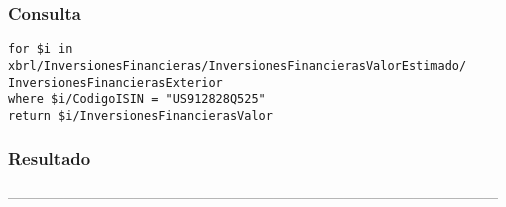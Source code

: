 \documentclass[11pt]{diazessay} %
\begin{document}
\subsubsection*{Consulta}
\lstset{language=C}
\begin{lstlisting}
for $i in xbrl/InversionesFinancieras/InversionesFinancierasValorEstimado/
InversionesFinancierasExterior
where $i/CodigoISIN = "US912828Q525"
return $i/InversionesFinancierasValor
\end{lstlisting}

\subsubsection*{Resultado}
 
---------------------------------------------------------------------------------------------------------\\



%
%
%
\end{document}
